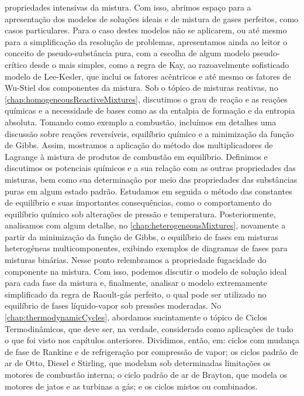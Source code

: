     propriedades intensivas da mistura. Com isso, abrimos espaço para a
    apresentação dos modelos de soluções ideais e de mistura de gases
    perfeitos, como casos particulares.  Para o caso destes modelos não se
    aplicarem, ou até mesmo para a simplificação da resolução de problemas,
    apresentamos ainda ao leitor o conceito de   pseudo-substância pura, com a
    escolha de algum modelo pseudo-crítico desde o mais simples, como a regra
    de Kay, ao razoavelmente sofisticado modelo de Lee-Kesler, que inclui os
    fatores acêntricos e até mesmo os fatores de Wu-Stiel dos componentes da
    mistura.  Sob o tópico de misturas reativas, no
    \cref{chap:homogeneousReactiveMixtures}, discutimos o grau de reação e as
    reações químicas e a necessidade de bases como as da entalpia de formação e
    da entropia absoluta. Tomando como exemplo a combustão, incluímos em
    detalhes uma discussão sobre reações reversíveis, equilíbrio químico e a
    minimização da função de Gibbs. Assim, mostramos a aplicação do método dos
    multiplicadores de Lagrange à mistura de produtos de combustão em
    equilíbrio.  Definimos e discutimos os potenciais químicos e a sua relação
    com as outras propriedades das misturas, bem como sua determinação por meio
    das propriedades das substâncias puras em algum estado padrão. Estudamos em
    seguida o método das constantes de equilíbrio e suas importantes
    consequências, como o comportamento do equilíbrio químico sob alterações de
    pressão e temperatura.  Posteriormente, analisamos com algum detalhe, no
    \cref{chap:heterogeneousMixtures}, novamente a partir da minimização da
    função de Gibbs, o equilíbrio de fases em misturas heterogêneas
    multicomponentes, exibindo exemplos de diagramas de fases para misturas
    binárias. Nesse ponto relembramos a propriedade fugacidade do componente na
    mistura. Com isso, podemos  discutir o modelo de solução ideal para cada
    fase da mistura e, finalmente, analisar o modelo extremamente simplificado
    da regra de Raoult-gás perfeito, o qual pode ser utilizado no equilíbrio de
    fases líquido-vapor  sob pressões moderadas. No
    \cref{chap:thermodynamicCycles}, abordamos sucintamente o tópico de Ciclos
    Termodinâmicos, que deve ser, na verdade, considerado como aplicações de
    tudo o que foi visto nos capítulos anteriores. Dividimos, então, em: ciclos
    com mudança de fase de Rankine e de refrigeração por compressão de vapor;
    os ciclos padrão de ar de Otto, Diesel e Stirling, que modelam sob
    determinadas limitações os motores de combustão interna; o ciclo padrão de
    ar de Brayton, que modela os motores de jatos e as turbinas a gás; e os
    ciclos mistos ou combinados.

